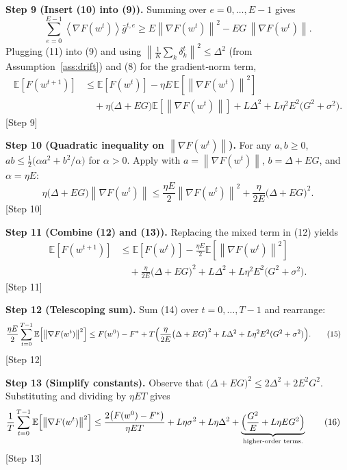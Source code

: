 \documentclass{article}
\newcommand{\E}{\mathbb{E}}
\newcommand{\norm}[1]{\left\lVert#1\right\rVert}
\newcommand{\inner}[1]{\left\langle#1\right\rangle}
\begin{document}
\noindent\textbf{Step 9 (Insert (10) into (9)).}  
Summing over $e=0,\dots,E-1$ gives
\[
    \sum_{e=0}^{E-1}\inner{\nabla F(w^{t})}{\bar{g}^{t,e}}
    \ge E\norm{\nabla F(w^{t})}^{2} - EG\,\norm{\nabla F(w^{t})}. \tag{11}
\]
Plugging (11) into (9) and using $\norm{\frac1K\sum_{k}\delta_{k}^{t}}^{2}\le\Delta^{2}$ (from Assumption~\ref{ass:drift}) and (8) for the gradient‑norm term,
\begin{align}
    \E\!\left[F(w^{t+1})\right]
    &\le \E\!\left[F(w^{t})\right]
       -\eta E\,\E\!\left[\norm{\nabla F(w^{t})}^{2}\right] \nonumber\\
    &\quad + \eta\bigl(\Delta+ EG\bigr)\E\!\left[\norm{\nabla F(w^{t})}\right]
       + L\Delta^{2}
       + L\eta^{2}E^{2}\bigl(G^{2}+\sigma^{2}\bigr). \tag{12}
\end{align}
[Step 9]

\noindent\textbf{Step 10 (Quadratic inequality on $\norm{\nabla F(w^{t})}$).}  
For any $a,b\ge0$, $ab\le \frac{1}{2}\bigl(\alpha a^{2}+b^{2}/\alpha\bigr)$ for $\alpha>0$.  Apply with $a=\norm{\nabla F(w^{t})}$, $b=\Delta+EG$, and $\alpha=\eta E$:
\[
    \eta\bigl(\Delta+ EG\bigr)\norm{\nabla F(w^{t})}
    \le \frac{\eta E}{2}\norm{\nabla F(w^{t})}^{2}
        + \frac{\eta}{2E}\bigl(\Delta+ EG\bigr)^{2}. \tag{13}
\]
[Step 10]

\noindent\textbf{Step 11 (Combine (12) and (13)).}  
Replacing the mixed term in (12) yields
\begin{align}
    \E\!\left[F(w^{t+1})\right]
    &\le \E\!\left[F(w^{t})\right]
       -\frac{\eta E}{2}\E\!\left[\norm{\nabla F(w^{t})}^{2}\right] \nonumber\\
    &\quad + \frac{\eta}{2E}\bigl(\Delta+ EG\bigr)^{2}
       + L\Delta^{2}
       + L\eta^{2}E^{2}\bigl(G^{2}+\sigma^{2}\bigr). \tag{14}
\end{align}
[Step 11]

\noindent\textbf{Step 12 (Telescoping sum).}  
Sum (14) over $t=0,\dots,T-1$ and rearrange:
\begin{align}
    \frac{\eta E}{2}\sum_{t=0}^{T-1}\E\!\left[\norm{\nabla F(w^{t})}^{2}\right]
    &\le F(w^{0})-F^{*}
       + T\Bigl(\frac{\eta}{2E}\bigl(\Delta+ EG\bigr)^{2}+L\Delta^{2}+L\eta^{2}E^{2}(G^{2}+\sigma^{2})\Bigr). \tag{15}
\end{align}
[Step 12]

\noindent\textbf{Step 13 (Simplify constants).}  
Observe that $\bigl(\Delta+ EG\bigr)^{2}\le 2\Delta^{2}+2E^{2}G^{2}$.  Substituting and dividing by $\eta E T$ gives
\begin{align}
    \frac{1}{T}\sum_{t=0}^{T-1}\E\!\left[\norm{\nabla F(w^{t})}^{2}\right]
    &\le \frac{2\bigl(F(w^{0})-F^{*}\bigr)}{\eta E T}
       + L\eta\sigma^{2}
       + L\eta\Delta^{2}
       + \underbrace{\Bigl(\frac{G^{2}}{E}+L\eta E G^{2}\Bigr)}_{\text{higher‑order terms}.} \tag{16}
\end{align}
[Step 13]
\end{document}
